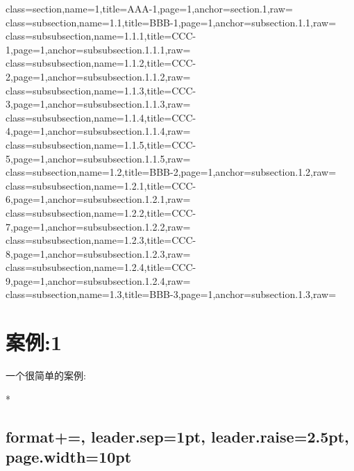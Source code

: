 \def\exampleUR{\texttt{data.ptoc}}
\begin{DocExample}[++]
class={section},name={1},title={AAA-1},page={1},anchor={section.1},raw={}
class={subsection},name={1.1},title={BBB-1},page={1},anchor={subsection.1.1},raw={}
class={subsubsection},name={1.1.1},title={CCC-1},page={1},anchor={subsubsection.1.1.1},raw={}
class={subsubsection},name={1.1.2},title={CCC-2},page={1},anchor={subsubsection.1.1.2},raw={}
class={subsubsection},name={1.1.3},title={CCC-3},page={1},anchor={subsubsection.1.1.3},raw={}
class={subsubsection},name={1.1.4},title={CCC-4},page={1},anchor={subsubsection.1.1.4},raw={}
class={subsubsection},name={1.1.5},title={CCC-5},page={1},anchor={subsubsection.1.1.5},raw={}
class={subsection},name={1.2},title={BBB-2},page={1},anchor={subsection.1.2},raw={}
class={subsubsection},name={1.2.1},title={CCC-6},page={1},anchor={subsubsection.1.2.1},raw={}
class={subsubsection},name={1.2.2},title={CCC-7},page={1},anchor={subsubsection.1.2.2},raw={}
class={subsubsection},name={1.2.3},title={CCC-8},page={1},anchor={subsubsection.1.2.3},raw={}
class={subsubsection},name={1.2.4},title={CCC-9},page={1},anchor={subsubsection.1.2.4},raw={}
class={subsection},name={1.3},title={BBB-3},page={1},anchor={subsection.1.3},raw={}
\end{DocExample}
\resetExampleUR



\clearpage
\section{案例:1} 一个很简单的案例:

\begin{DocExample}*
\begingroup
\ztocformat\subsection
  {
    format+=\color{teal}, 
    leader.sep=1pt, 
    leader.raise=2.5pt, 
    page.width=10pt
  }
%
  {%
    \begin{framed}%
    \qquad\rule[-5em]{.5pt}{10em}%
    \begin{minipage}{.75\linewidth}%
  }
\ztocgroupinsert{subsection,1,end}%
  {%
    \end{minipage}%
    \end{framed}%
  }
\endgroup
\end{DocExample}

